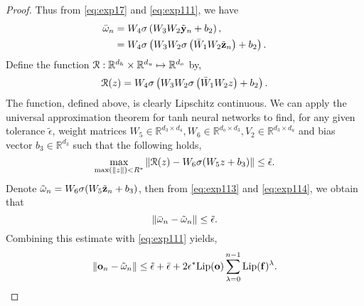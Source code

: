 \documentclass{article} \usepackage{iclr2022_conference,times}
\newcommand{\by}{{\bf y}}
\newcommand{\bz}{{\bf z}}
\newcommand{\bo}{{\bf o}}
\newcommand{\R}{{\mathbb R}}
\newcommand{\cR}{\EuScript{R}}
\newcommand{\bif}{{\bf f}}
\newcommand{\bom}{{\bf \omega}}
\begin{document}
\begin{proof}
Thus from \eqref{eq:exp17} and \eqref{eq:exp111}, we have
\begin{equation}
    \label{eq:exp114}
\begin{aligned}
\bar{\bom}_n &= W_4\sigma\left(W_3W_2\tilde{\by}_n + b_2\right),\\
&= W_4\sigma\left(W_3W_2\sigma\left(\bar{W}_1 W_2\tilde{\bz}_n \right)+ b_2\right). \\
\end{aligned}
\end{equation}
Define the function $\cR: \R^{d_h} \times \R^{d_u} \mapsto \R^{d_o}$ by,
\begin{equation}
    \label{eq:exp112}
    \cR(z) = W_4\sigma\left(W_3W_2\sigma\left(\bar{W}_1 W_2z \right)+ b_2\right).
\end{equation}
The function, defined above, is clearly Lipschitz continuous. We can apply the universal approximation theorem for tanh neural networks to find, for any given tolerance $\tilde{\epsilon}$, weight matrices $W_5 \in \R^{d_3 \times d_4}, W_6 \in \R^{d_o \times d_3}, V_2 \in \R^{d_3 \times d_u}$ and bias vector $b_3 \in \R^{d_3}$ such that the following holds,
\begin{equation}
    \label{eq:exp113}
    \max\limits_{\max(\|z\|)< R^{\ast}} \|\cR(z) - W_6\sigma(W_5z + b_3) \| \leq \tilde{\epsilon} .
\end{equation}
Denote $\tilde{\bom}_n = W_6\sigma(W_5\tilde{\bz}_{n} + b_3)$, then from \eqref{eq:exp113} and \eqref{eq:exp114}, we obtain that
\begin{equation*}
\|\bar{\omega}_n - \tilde{\bom}_n\| \leq \tilde{\epsilon}.
\end{equation*}
Combining this estimate with \eqref{eq:exp111} yields,
\begin{equation}
    \label{eq:exp115}
     \|\bo_n - \tilde{\bom}_n\| \leq \tilde{\epsilon} + \bar{\epsilon} + 2 \epsilon^{\ast} {\rm Lip}(\bo)\sum_{\lambda=0}^{n-1}{\rm Lip}(\bif)^\lambda.
\end{equation}


\end{proof}
\end{document}
